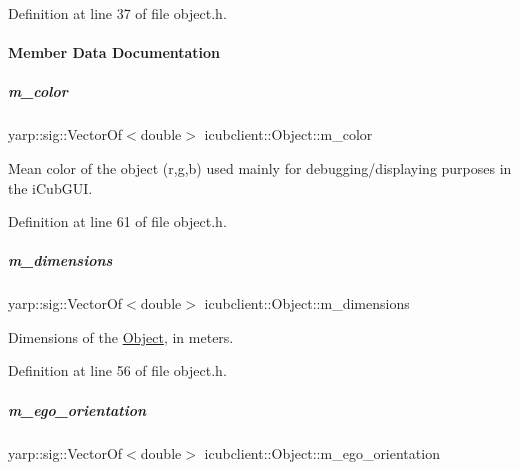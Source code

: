 Definition at line 37 of file object.\+h.



\paragraph{Member Data Documentation}
\mbox{\label{group__icubclient__representations_ace0d43079d691484cfe2f0a96ffebd14}} 
\subparagraph{\texorpdfstring{m\+\_\+color}{m\_color}}
{\footnotesize\ttfamily yarp\+::sig\+::\+Vector\+Of$<$double$>$ icubclient\+::\+Object\+::m\+\_\+color}



Mean color of the object (r,g,b) used mainly for debugging/displaying purposes in the i\+Cub\+G\+UI. 



Definition at line 61 of file object.\+h.

\mbox{\label{group__icubclient__representations_ad3a16bbccf720dbf2d6c47af362af860}} 
\subparagraph{\texorpdfstring{m\+\_\+dimensions}{m\_dimensions}}
{\footnotesize\ttfamily yarp\+::sig\+::\+Vector\+Of$<$double$>$ icubclient\+::\+Object\+::m\+\_\+dimensions}



Dimensions of the \hyperlink{group__icubclient__representations_classicubclient_1_1Object}{Object}, in meters. 



Definition at line 56 of file object.\+h.

\mbox{\label{group__icubclient__representations_a9a76ee654f30131f0ccb31b08fc088d3}} 
\subparagraph{\texorpdfstring{m\+\_\+ego\+\_\+orientation}{m\_ego\_orientation}}
{\footnotesize\ttfamily yarp\+::sig\+::\+Vector\+Of$<$double$>$ icubclient\+::\+Object\+::m\+\_\+ego\+\_\+orientation}



